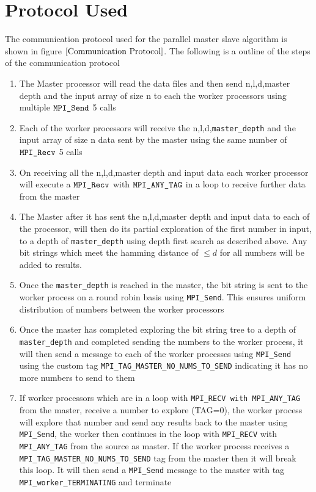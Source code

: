 \documentclass[twoside,11pt]{article}\usepackage{amsmath,amsfonts,amsthm,fullpage}
\begin{document}
\section{Protocol Used}
\label{protocol_used}
The communication protocol used for the parallel master slave algorithm is shown in figure $\eqref{Communication Protocol}$. The following is a outline of the steps of the communication protocol
\begin{enumerate}
\item
The Master processor will read the data files and then send n,l,d,master depth and the input array of size n to each the worker processors using multiple $\verb|MPI_Send|$ 5 calls
\item
Each of the worker processors will receive the  n,l,d,\verb|master_depth| and the input array of size n data sent by the master using the same number of $\verb|MPI_Recv|$ 5 calls
\item
On receiving all the n,l,d,master depth and input data each worker processor will execute a $\verb|MPI_Recv|$ with $\verb|MPI_ANY_TAG|$ in a loop to receive further data from the master
\item
The Master after it has sent the n,l,d,master depth and input data to each of the processor, will then do its partial exploration of the first number in input, to a depth of \verb|master_depth| using depth first search as described above. Any bit strings which meet the hamming distance of $\le d$ for all numbers will be added to results.
\item
Once the \verb|master_depth| is reached in the master, the bit string is sent to the worker process on a round robin basis using \verb|MPI_Send|. This ensures uniform distribution of numbers between the worker processors
\item
Once the master has completed exploring the bit string tree to a depth of \verb|master_depth| and completed sending the numbers to the worker process, it will then send a message to each of the worker processes using \verb|MPI_Send| using the custom tag \verb|MPI_TAG_MASTER_NO_NUMS_TO_SEND| indicating it has no more numbers to send to them
\item
If worker processors which are in a loop with \verb|MPI_RECV with MPI_ANY_TAG| from the master, receive a number to explore (TAG=0), the worker process will explore that number and send any results back to the master using \verb|MPI_Send|, the worker then continues in the loop with \verb|MPI_RECV| with \verb|MPI_ANY_TAG| from the source as master. If the worker process receives a \verb|MPI_TAG_MASTER_NO_NUMS_TO_SEND| tag from the master then it will break this loop. It will then send a \verb|MPI_Send| message to the master with tag \verb|MPI_worker_TERMINATING| and terminate

\end{enumerate}
\end{document}
